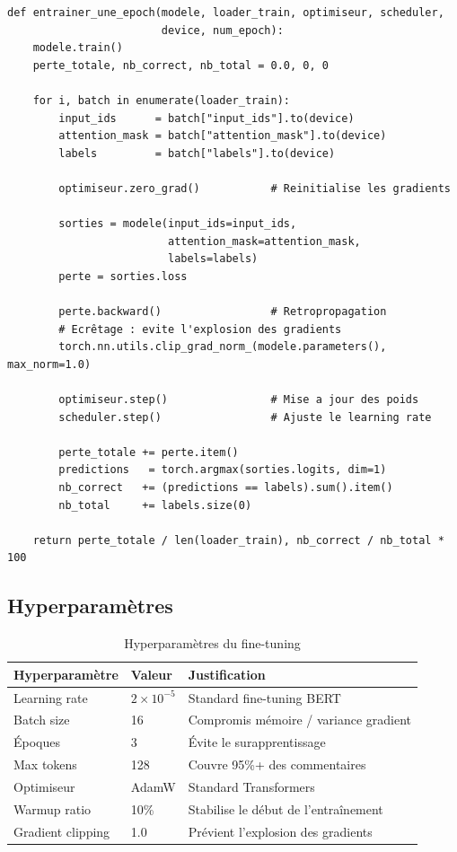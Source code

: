 \documentclass[12pt,a4paper,oneside]{report}
\begin{document}
\begin{lstlisting}[style=stylePython,caption={Boucle fine-tuning CamemBERT},label={lst:training}]
def entrainer_une_epoch(modele, loader_train, optimiseur, scheduler,
                        device, num_epoch):
    modele.train()
    perte_totale, nb_correct, nb_total = 0.0, 0, 0

    for i, batch in enumerate(loader_train):
        input_ids      = batch["input_ids"].to(device)
        attention_mask = batch["attention_mask"].to(device)
        labels         = batch["labels"].to(device)

        optimiseur.zero_grad()           # Reinitialise les gradients

        sorties = modele(input_ids=input_ids,
                         attention_mask=attention_mask,
                         labels=labels)
        perte = sorties.loss

        perte.backward()                 # Retropropagation
        # Ecrêtage : evite l'explosion des gradients
        torch.nn.utils.clip_grad_norm_(modele.parameters(), max_norm=1.0)

        optimiseur.step()                # Mise a jour des poids
        scheduler.step()                 # Ajuste le learning rate

        perte_totale += perte.item()
        predictions   = torch.argmax(sorties.logits, dim=1)
        nb_correct   += (predictions == labels).sum().item()
        nb_total     += labels.size(0)

    return perte_totale / len(loader_train), nb_correct / nb_total * 100
\end{lstlisting}

\subsection{Hyperparamètres}

\begin{table}[H]
\centering
\caption{Hyperparamètres du fine-tuning}
\label{tab:hyperparams}
\renewcommand{\arraystretch}{1.4}
\begin{tabular}{lll}
\toprule
\rowcolor{bleuprincipal!15}
\textbf{Hyperparamètre} & \textbf{Valeur} & \textbf{Justification} \\
\midrule
Learning rate & $2\times10^{-5}$ & Standard fine-tuning BERT \\
\rowcolor{gray!8}
Batch size & 16 & Compromis mémoire / variance gradient \\
Époques & 3 & Évite le surapprentissage \\
\rowcolor{gray!8}
Max tokens & 128 & Couvre 95\%+ des commentaires \\
Optimiseur & AdamW \cite{loshchilov2019adamw} & Standard Transformers \\
\rowcolor{gray!8}
Warmup ratio & 10\% & Stabilise le début de l'entraînement \\
Gradient clipping & 1.0 & Prévient l'explosion des gradients \\
\bottomrule
\end{tabular}
\end{table}
\end{document}
